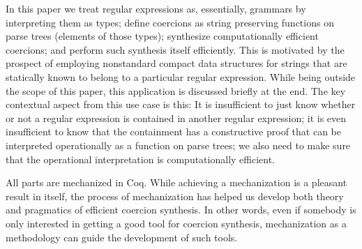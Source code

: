 In this paper we treat regular expressions as, essentially, grammars by interpreting them as types; 
define coercions as string preserving functions on parse trees (elements of those types); 
synthesize computationally efficient coercions; and perform such synthesis itself efficiently.  
This is motivated by the prospect of employing nonstandard compact data structures for strings that are statically known to belong to a particular regular expression.  While being outside the scope of this paper, this application is discussed briefly at the end.  The key contextual aspect from this use case is this: It is insufficient to just know whether or not a regular expression is contained in another regular expression; it is even insufficient to know that the containment has a constructive proof that can be interpreted operationally as a function on parse trees; we also need to make sure that the operational interpretation is computationally efficient.   

All parts are mechanized in Coq.  While achieving a mechanization is a pleasant result in itself, the process of mechanization has helped us develop both theory and pragmatics of efficient coercion synthesis.  In other words, even if somebody is only interested in getting a good tool for coercion synthesis, mechanization as a methodology can guide the development of such tools.
  






